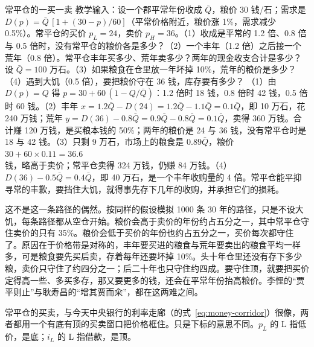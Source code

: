 \begin{example}{常平仓的一买一卖}\label{ex:qinhan-band}
教学输入：设一个郡平常年份收成 $\bar Q$，粮价 30 钱/石；需求是 $D(p)=\bar Q\,[1+(30-p)/60]$（平常价格附近，粮价涨 1\%，需求减少 0.5\%）。常平仓的买价 $p_L=24$，卖价 $p_H=36$。（1）收成是平常的 1.2 倍、0.8 倍与 0.5 倍时，没有常平仓的粮价各是多少？（2）一个丰年（1.2 倍）之后接一个荒年（0.8 倍）。常平仓丰年买多少、荒年卖多少？两年的现金收支合计是多少？设 $\bar Q=100$ 万石。（3）如果粮食在仓里放一年坏掉 10\%，荒年的粮价是多少？（4）遇到大饥（0.5 倍），要把粮价守在 36 钱，库存要有多少？
\solution （1）由 $D(p)=Q$ 得 $p=30+60\,(1-Q/\bar Q)$：1.2 倍时 18 钱，0.8 倍时 42 钱，0.5 倍时 60 钱。（2）丰年 $x=1.2\bar Q-D(24)=1.2\bar Q-1.1\bar Q=0.1\bar Q$，即 10 万石，花 240 万钱；荒年 $y=D(36)-0.8\bar Q=0.9\bar Q-0.8\bar Q=0.1\bar Q$，卖得 360 万钱。合计赚 120 万钱，是买粮本钱的 50\%；两年的粮价是 24 与 36 钱，没有常平仓时是 18 与 42 钱。（3）只剩 9 万石，市场上的粮食是 $0.89\bar Q$，粮价 $30+60\times0.11=36.6$ 钱，略高于卖价；常平仓卖得 324 万钱，仍赚 84 万钱。（4）$D(36)-0.5\bar Q=0.4\bar Q$，即 40 万石，是一个丰年收购量的 4 倍。常平仓能平抑寻常的丰歉，要挡住大饥，就得事先存下几年的收购，并承担它们的损耗。
\end{example}


这不是这一条路径的偶然。按同样的假设模拟 1000 条 30 年的路径，只是不设大饥，每条路径都从空仓开始。粮价会高于卖价的年份约占五分之一，其中常平仓守住卖价的只有 35\%。粮价会低于买价的年份也约占五分之一，买价每次都守住了。原因在于价格带是对称的，丰年要买进的粮食与荒年要卖出的粮食平均一样多，可是粮食要先买后卖，存着每年还要坏掉 10\%。头十年仓里还没有存下多少粮，卖价只守住了约四分之一；后二十年也只守住约四成。要守住顶，就要把买价定得高一些、多买多存，那又要更多的钱，还会在平常年份抬高粮价。李悝的“贾平则止”与耿寿昌的“增其贾而籴”，都在这两难之间。

常平仓的买卖，与今天中央银行的利率走廊（的式~\eqref{eq:money-corridor}）很像，两者都用一个有底有顶的买卖窗口把价格框住。只是下标的意思不同。$p_L$ 的 L 指低价，是底；$i_L$ 的 L 指借款，是顶。


